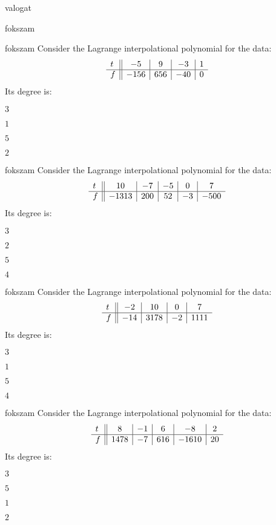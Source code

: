 \documentclass[12pt]{article}
\begin{document}
\begin{quiz}{valogat}
\begin{multi}{fokszam}
\end{multi}
\begin{multi}{fokszam}
Consider the Lagrange interpolational polynomial for the data:
$$\begin{array}{l ||c|c|c|c}t&-5&9&-3&1\\ \hline f&-156&656&-40&0 \\ \end{array}$$
Its degree is:
\item* $ 3 $
\item  $ 1 $
\item  $ 5 $
\item  $ 2 $
\end{multi}
\begin{multi}{fokszam}
Consider the Lagrange interpolational polynomial for the data:
$$\begin{array}{l ||c|c|c|c|c}t&10&-7&-5&0&7\\ \hline f&-1313&200&52&-3&-500 \\ \end{array}$$
Its degree is:
\item* $ 3 $
\item  $ 2 $
\item  $ 5 $
\item  $ 4 $
\end{multi}
\begin{multi}{fokszam}
Consider the Lagrange interpolational polynomial for the data:
$$\begin{array}{l ||c|c|c|c}t&-2&10&0&7\\ \hline f&-14&3178&-2&1111 \\ \end{array}$$
Its degree is:
\item* $ 3 $
\item  $ 1 $
\item  $ 5 $
\item  $ 4 $
\end{multi}
\begin{multi}{fokszam}
Consider the Lagrange interpolational polynomial for the data:
$$\begin{array}{l ||c|c|c|c|c}t&8&-1&6&-8&2\\ \hline f&1478&-7&616&-1610&20 \\ \end{array}$$
Its degree is:
\item* $ 3 $
\item  $ 5 $
\item  $ 1 $
\item  $ 2 $

\end{multi}
\end{quiz}
\end{document}
